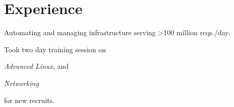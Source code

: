 \documentclass[]{deedy}
\begin{document}
\begin{minipage}[t]{0.65\textwidth}


\section{Experience}
\sectionsep

\begin{tightemize}
\item Automating and managing infrastructure serving >100 million reqs./day.
\item Took two day training session on 
\begin{enumerate*}[label=(\roman*)]
  \item \textit{Advanced Linux}, and
  \item \textit{Networking}
\end{enumerate*}
 for new recruits.
\end{tightemize}
\sectionsep


\end{minipage}
\end{document}
